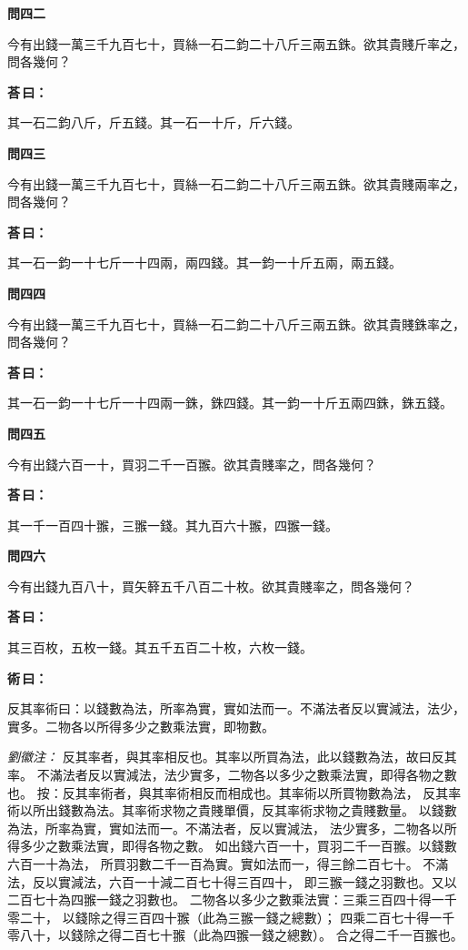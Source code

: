 \documentclass[11pt,a4paper]{article}
\newenvironment{problem}[1][]{%
  \par\vspace{0.6em}\noindent\textcolor{problemcolor}{\textbf{問\ignorespaces#1\unskip}\hspace{0.5em}}%
  \ignorespaces
}{\par\vspace{0.4em}}
\newenvironment{answer}{%
  \par\noindent\textcolor{answercolor}{\textbf{荅\,曰：}}%
  \ignorespaces
}{\par\vspace{0.3em}}
\newenvironment{method}{%
  \par\noindent\textcolor{methodcolor}{\textbf{術\,曰：}}%
  \ignorespaces
}{\par\vspace{0.4em}}
\newenvironment{liuhuicomm}{%
  \par\vspace{0.3em}\noindent\textcolor{commentarycolor}{\small\textit{劉徽注：}}}%
  {\par\vspace{0.5em}}
\begin{document}
\begin{problem}[四二]
今有出錢一萬三千九百七十，買絲一石二鈞二十八斤三兩五銖。欲其貴賤斤率之，問各幾何？
\end{problem}

\begin{answer}
其一石二鈞八斤，斤五錢。其一石一十斤，斤六錢。
\end{answer}

\begin{problem}[四三]
今有出錢一萬三千九百七十，買絲一石二鈞二十八斤三兩五銖。欲其貴賤兩率之，問各幾何？
\end{problem}

\begin{answer}
其一石一鈞一十七斤一十四兩，兩四錢。其一鈞一十斤五兩，兩五錢。
\end{answer}

\begin{problem}[四四]
今有出錢一萬三千九百七十，買絲一石二鈞二十八斤三兩五銖。欲其貴賤銖率之，問各幾何？
\end{problem}

\begin{answer}
其一石一鈞一十七斤一十四兩一銖，銖四錢。其一鈞一十斤五兩四銖，銖五錢。
\end{answer}

\begin{problem}[四五]
今有出錢六百一十，買羽二千一百翭。欲其貴賤率之，問各幾何？
\end{problem}

\begin{answer}
其一千一百四十翭，三翭一錢。其九百六十翭，四翭一錢。
\end{answer}

\begin{problem}[四六]
今有出錢九百八十，買矢簳五千八百二十枚。欲其貴賤率之，問各幾何？
\end{problem}

\begin{answer}
其三百枚，五枚一錢。其五千五百二十枚，六枚一錢。
\end{answer}

\begin{method}
反其率術曰：以錢數為法，所率為實，實如法而一。不滿法者反以實減法，法少，實多。二物各以所得多少之數乘法實，即物數。
\end{method}

\begin{liuhuicomm}
反其率者，與其率相反也。其率以所買為法，此以錢數為法，故曰反其率。
不滿法者反以實減法，法少實多，二物各以多少之數乘法實，即得各物之數也。
按：反其率術者，與其率術相反而相成也。其率術以所買物數為法，
反其率術以所出錢數為法。其率術求物之貴賤單價，反其率術求物之貴賤數量。
以錢數為法，所率為實，實如法而一。不滿法者，反以實減法，
法少實多，二物各以所得多少之數乘法實，即得各物之數。
如出錢六百一十，買羽二千一百翭。以錢數六百一十為法，
所買羽數二千一百為實。實如法而一，得三餘二百七十。
不滿法，反以實減法，六百一十減二百七十得三百四十，
即三翭一錢之羽數也。又以二百七十為四翭一錢之羽數也。
二物各以多少之數乘法實：三乘三百四十得一千零二十，
以錢除之得三百四十翭（此為三翭一錢之總數）；
四乘二百七十得一千零八十，以錢除之得二百七十翭（此為四翭一錢之總數）。
合之得二千一百翭也。
\end{liuhuicomm}
\end{document}

